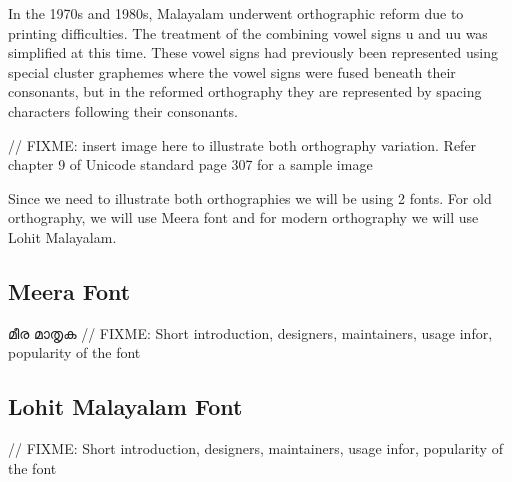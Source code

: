 In the 1970s and 1980s, Malayalam underwent orthographic reform due to
printing difficulties. The treatment of the combining vowel signs u
and uu was simplified at this time. These vowel signs had previously
been represented using special cluster graphemes where the vowel signs
were fused beneath their consonants, but in the reformed orthography
they are represented by spacing characters following their consonants.

// FIXME: insert image here to illustrate both orthography
variation. Refer chapter 9 of Unicode standard page 307 for a sample
image


Since we need to illustrate both orthographies we will be using 2
fonts. For old orthography, we will use Meera font and for modern
orthography we will use Lohit Malayalam.

\subsection {Meera Font}
{\meera മീര മാതൃക }
// FIXME: Short introduction, designers, maintainers, usage infor,
popularity of the font

\subsection {Lohit Malayalam Font}
// FIXME: Short introduction, designers, maintainers, usage infor,
popularity of the font
